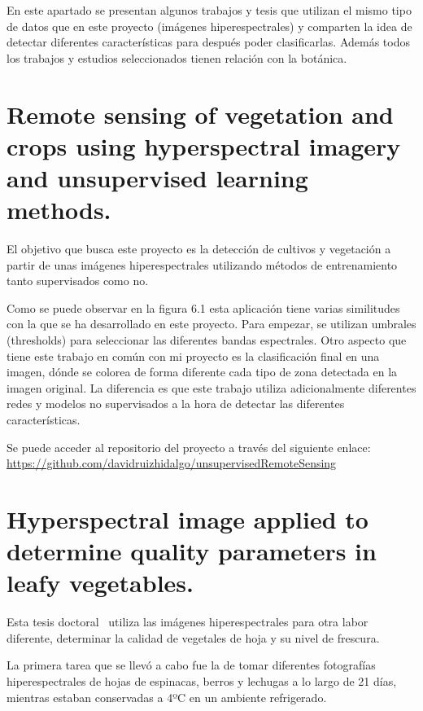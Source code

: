 En este apartado se presentan algunos trabajos y tesis que utilizan el mismo tipo de datos que en este proyecto (imágenes hiperespectrales) y comparten la idea de detectar diferentes características para después poder clasificarlas. Además todos los trabajos y estudios seleccionados tienen relación con la botánica.

\section{Remote sensing of vegetation and crops using hyperspectral imagery and unsupervised learning methods.}
El objetivo que busca este proyecto es la detección de cultivos y vegetación a partir de unas imágenes hiperespectrales utilizando métodos de entrenamiento tanto supervisados como no. 


Como se puede observar en la figura 6.1 esta aplicación tiene varias similitudes con la que se ha desarrollado en este proyecto. Para empezar, se utilizan umbrales (thresholds) para seleccionar las diferentes bandas espectrales. Otro aspecto que tiene este trabajo en común con mi proyecto es la clasificación final en una imagen, dónde se colorea de forma diferente cada tipo de zona detectada en la imagen original. La diferencia es que este trabajo utiliza adicionalmente diferentes redes y modelos no supervisados a la hora de detectar las diferentes características.

Se puede acceder al repositorio del proyecto a través del siguiente enlace:
\href{https://github.com/davidruizhidalgo/unsupervisedRemoteSensing}{https://github.com/davidruizhidalgo/unsupervisedRemoteSensing}

\section{Hyperspectral image applied to determine quality parameters in leafy vegetables.}
Esta tesis doctoral~\cite{upm44931} utiliza las imágenes hiperespectrales para otra labor diferente, determinar la calidad de vegetales de hoja y su nivel de frescura. 

La primera tarea que se llevó a cabo fue la de tomar diferentes fotografías hiperespectrales de hojas de espinacas, berros y lechugas a lo largo de 21 días, mientras estaban conservadas a 4ºC en un ambiente refrigerado. 

